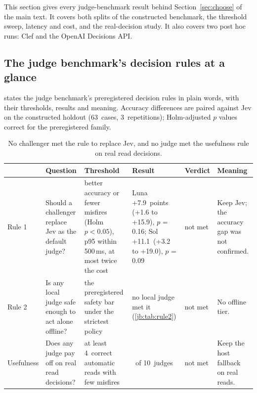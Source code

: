 \documentclass[11pt,letterpaper]{article}
\newcommand{\HoldN}{63}
\newcommand{\HoldReps}{3}
\newcommand{\LunaHoldRAccDiff}{+7.9}
\newcommand{\LunaHoldRAccDiffCI}{+1.6 to +15.9}
\newcommand{\LunaHoldRAccPHolm}{0.16}
\newcommand{\NumBase}{10}
\newcommand{\SolHoldRAccDiff}{+11.1}
\newcommand{\SolHoldRAccDiffCI}{+3.2 to +19.0}
\newcommand{\SolHoldRAccPHolm}{0.09}
\newcommand{\TrNUseful}{0}
\newcommand{\TrUsefulMinReads}{4}
\newcommand{\mainpaper}{the main text}\newcommand{\thissupp}{these appendices}\newcommand{\Thissupp}{These appendices}
\begin{document}
This section gives every judge-benchmark result behind Section~\ref{sec:choose} of \mainpaper{}. It covers both
splits of the constructed benchmark, the threshold sweep, latency and cost, and the real-decision study. It also
covers two post hoc runs: Clef and the OpenAI Decisions API.

\subsection{The judge benchmark's decision rules at a glance}\label{sec:bhyp}

 states the judge benchmark's preregistered decision rules in plain words, with their thresholds, results
and meaning. Accuracy differences are paired against Jev on the constructed holdout (\HoldN\ cases, \HoldReps\
repetitions); Holm-adjusted $p$ values correct for the preregistered family.

\begin{table}[tbp]
\centering\footnotesize
\caption{No challenger met the rule to replace Jev, and no judge met the usefulness rule on real read decisions.}
\label{tab:bhyp}
\begin{tabularx}{\textwidth}{@{}l >{\raggedright\arraybackslash}p{} >{\raggedright\arraybackslash}p{}
  >{\raggedright\arraybackslash}p{0.2\textwidth} >{\raggedright\arraybackslash}p{0.08\textwidth} >{\raggedright\arraybackslash}X@{}}
\toprule
 & Question & Threshold & Result & Verdict & Meaning \\
\midrule
Rule 1 & Should a challenger replace Jev as the default judge? & better accuracy or fewer misfires (Holm $p<0.05$), p95
  within 500\,ms, at most twice the cost & Luna \LunaHoldRAccDiff\ points (\LunaHoldRAccDiffCI), $p$ = \LunaHoldRAccPHolm;
  Sol \SolHoldRAccDiff\ (\SolHoldRAccDiffCI), $p$ = \SolHoldRAccPHolm & not met & Keep Jev; the accuracy gap was not
  confirmed. \\
Rule 2 & Is any local judge safe enough to act alone offline? & the preregistered safety bar under the strictest policy
  & no local judge met it (\cref{jb:tab:rule2}) & not met & No offline tier. \\
Usefulness & Does any judge pay off on real read decisions? & at least \TrUsefulMinReads\ correct automatic reads with
  few misfires & \TrNUseful\ of \NumBase\ judges & not met & Keep the host fallback on real reads. \\
\bottomrule
\end{tabularx}
\end{table}
\end{document}
